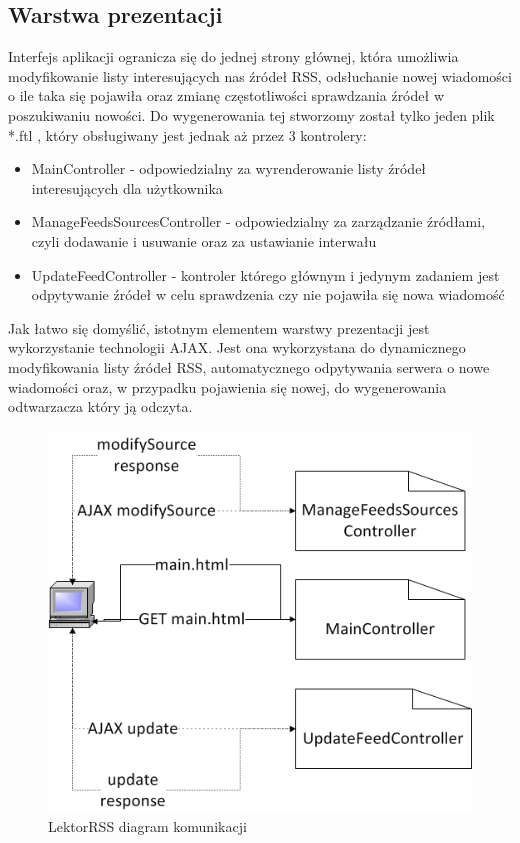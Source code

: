 \subsection{Warstwa prezentacji}
Interfejs aplikacji ogranicza się do jednej strony głównej, która umożliwia modyfikowanie listy interesujących nas źródeł RSS, odsłuchanie nowej wiadomości o ile taka się pojawiła oraz zmianę częstotliwości sprawdzania źródeł w poszukiwaniu nowości.
Do wygenerowania tej stworzomy został tylko jeden plik *.ftl , który obsługiwany jest jednak aż przez 3 kontrolery:
 \begin{itemize}
	\item MainController - odpowiedzialny za wyrenderowanie listy źródeł interesujących dla użytkownika
	\item ManageFeedsSourcesController - odpowiedzialny za zarządzanie źródłami, czyli dodawanie i usuwanie oraz za ustawianie interwału
	\item UpdateFeedController - kontroler którego głównym i jedynym zadaniem jest odpytywanie źródeł w celu sprawdzenia czy nie pojawiła się nowa wiadomość
\end{itemize}
Jak łatwo się domyślić, istotnym elementem warstwy prezentacji jest wykorzystanie technologii AJAX. Jest ona wykorzystana do dynamicznego modyfikowania listy źródeł RSS, automatycznego odpytywania serwera o nowe wiadomości oraz, w przypadku pojawienia się nowej, do wygenerowania odtwarzacza który ją odczyta.
\begin{figure}[!h]
	\centering
	\includegraphics[scale=0.65]{LektorRSSKomunikacja.png} 
	\caption{LektorRSS diagram komunikacji}
\end{figure}
